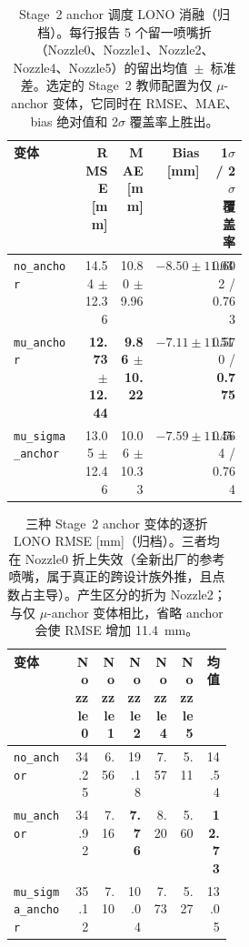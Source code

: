 \begin{table}[t]
\centering
\footnotesize
\setlength{\tabcolsep}{4pt}
\begin{tabular}{@{}L{0.30\linewidth}rrrr@{}}
\toprule
变体 & RMSE [mm] & MAE [mm] & Bias [mm] & 1$\sigma$ / 2$\sigma$ 覆盖率 \\
\midrule
\texttt{no\_anchor}        & 14.54 $\pm$ 12.36 & 10.80 $\pm$ \phantom{0}9.96 & $-8.50 \pm 11.03$ & 0.602 / 0.763 \\
\texttt{mu\_anchor}        & \textbf{12.73 $\pm$ 12.44} & \textbf{\phantom{0}9.86 $\pm$ 10.22} & \textbf{\boldmath$-7.11 \pm 11.51$} & 0.570 / \textbf{0.775} \\
\texttt{mu\_sigma\_anchor} & 13.05 $\pm$ 12.46 & 10.06 $\pm$ 10.33 & $-7.59 \pm 11.45$ & 0.564 / 0.764 \\
\bottomrule
\end{tabular}
\caption{Stage~2 anchor 调度 LONO 消融（归档）。每行报告 5 个留一喷嘴折（Nozzle0、Nozzle1、Nozzle2、Nozzle4、Nozzle5）的留出均值~$\pm$~标准差。选定的 Stage~2 教师配置为仅 $\mu$-anchor 变体，它同时在 RMSE、MAE、bias 绝对值和 2$\sigma$ 覆盖率上胜出。}
\label{tab:stage2-anchor-ablation}
\end{table}

\begin{table}[t]
\centering
\footnotesize
\setlength{\tabcolsep}{4pt}
\begin{tabular}{@{}L{0.28\linewidth}rrrrr|r@{}}
\toprule
变体 & Nozzle0 & Nozzle1 & Nozzle2 & Nozzle4 & Nozzle5 & 均值 \\
\midrule
\texttt{no\_anchor}        & 34.25 & \phantom{0}6.56 & 19.18 & 7.57 & 5.11 & 14.54 \\
\texttt{mu\_anchor}        & 34.92 & \phantom{0}7.16 & \textbf{\phantom{0}7.76} & 8.20 & 5.60 & \textbf{12.73} \\
\texttt{mu\_sigma\_anchor} & 35.12 & \phantom{0}7.10 & 10.04 & 7.73 & 5.27 & 13.05 \\
\bottomrule
\end{tabular}
\caption{三种 Stage~2 anchor 变体的逐折 LONO RMSE [mm]（归档）。三者均在 Nozzle0 折上失效（全新出厂的参考喷嘴，属于真正的跨设计族外推，且点数占主导）。产生区分的折为 Nozzle2；与仅 $\mu$-anchor 变体相比，省略 anchor 会使 RMSE 增加 \SI{11.4}{mm}。}
\label{tab:stage2-anchor-ablation-per-fold}
\end{table}

